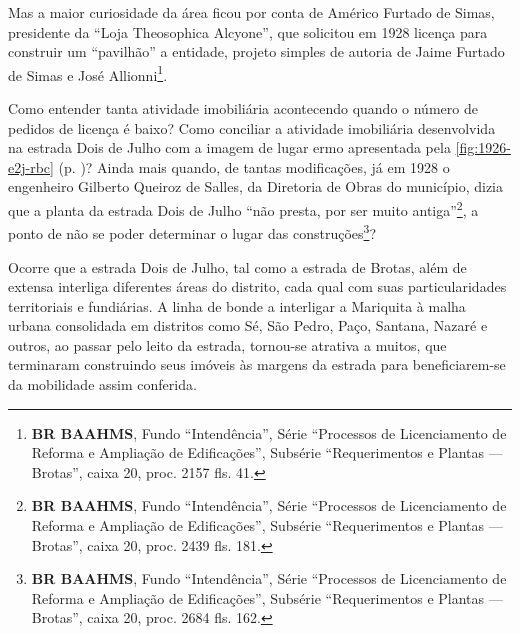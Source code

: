 
Mas a maior curiosidade da área ficou por conta de Américo Furtado de Simas, presidente da ``Loja Theosophica Alcyone'', que solicitou em 1928 licença para construir um ``pavilhão'' a entidade, projeto simples de autoria de Jaime Furtado de Simas e José Allionni\footnote{\textbf{BR BAAHMS}, Fundo ``Intendência'', Série ``Processos de Licenciamento de Reforma e Ampliação de Edificações'', Subsérie ``Requerimentos e Plantas --- Brotas'', caixa 20, proc. 2157 fls. 41.}.


Como entender tanta atividade imobiliária acontecendo quando o número de pedidos de licença é baixo? Como conciliar a atividade imobiliária desenvolvida na estrada Dois de Julho com a imagem de lugar ermo apresentada pela \autoref{fig:1926-e2j-rbc} (p. \pageref{fig:1926-e2j-rbc})? Ainda mais quando, de tantas modificações, já em 1928 o engenheiro Gilberto Queiroz de Salles, da Diretoria de Obras do município, dizia que a planta da estrada Dois de Julho ``não presta, por ser muito antiga''\footnote{\textbf{BR BAAHMS}, Fundo ``Intendência'', Série ``Processos de Licenciamento de Reforma e Ampliação de Edificações'', Subsérie ``Requerimentos e Plantas --- Brotas'', caixa 20, proc. 2439 fls. 181.}, a ponto de não se poder determinar o lugar das construções\footnote{\textbf{BR BAAHMS}, Fundo ``Intendência'', Série ``Processos de Licenciamento de Reforma e Ampliação de Edificações'', Subsérie ``Requerimentos e Plantas --- Brotas'', caixa 20, proc. 2684 fls. 162.}?

Ocorre que a estrada Dois de Julho, tal como a estrada de Brotas, além de extensa interliga diferentes áreas do distrito, cada qual com suas particularidades territoriais e fundiárias. A linha de bonde a interligar a Mariquita à malha urbana consolidada em distritos como Sé, São Pedro, Paço, Santana, Nazaré e outros, ao passar pelo leito da estrada, tornou-se atrativa a muitos, que terminaram construindo seus imóveis às margens da estrada para beneficiarem-se da mobilidade assim conferida.

